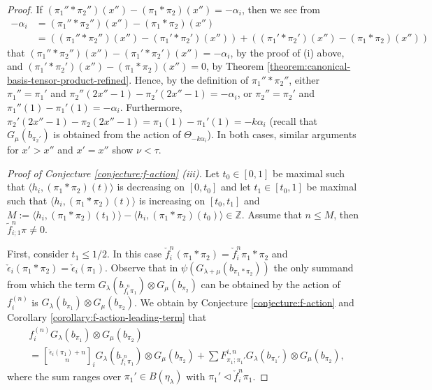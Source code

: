 \documentclass[final]{amsart}
\theoremstyle{plain}
\theoremstyle{definition}
\newcommand{\qbinom}{\genfrac{[}{]}{0pt}{}}
\newcommand{\bbZ}{\mathbb Z}
\newcommand{\tf}{\tilde f}
\newcommand{\cf}{\check{f}}
\newcommand{\cepsilon}{\check{\epsilon}}
\begin{document}
\begin{proof}
    If $(\pi_1''*\pi_2'')(x'') - (\pi_1*\pi_2)(x'') = -\alpha_i$, then we see from
    \begin{align*}
        -\alpha_i
        &= (\pi_1''*\pi_2'')(x'') - (\pi_1*\pi_2)(x'') \\
        &= ((\pi_1''*\pi_2'')(x'') - (\pi_1'*\pi_2')(x'')) + ((\pi_1'*\pi_2')(x'') - (\pi_1*\pi_2)(x''))
    \end{align*}
    that $(\pi_1''*\pi_2'')(x'') - (\pi_1'*\pi_2')(x'') = -\alpha_i$, by the proof of (i) above, and $(\pi_1'*\pi_2')(x'') - (\pi_1*\pi_2)(x'') = 0$, by Theorem \ref{theorem:canonical-basis-tensor-product-refined}.
    Hence, by the definition of $\pi_1''*\pi_2''$, either $\pi_1'' = \pi_1'$ and $\pi_2''(2x''-1) - \pi_2'(2x''-1) = -\alpha_i$, or $\pi_2'' = \pi_2'$ and $\pi_1''(1) - \pi_1'(1) = -\alpha_i$.
    Furthermore, $\pi_2'(2x''-1)- \pi_2(2x''-1) = \pi_1(1) - \pi_1'(1) = -k\alpha_i$ (recall that $G_\mu(b_{\pi_2'})$ is obtained from the action of $\Theta_{-k\alpha_i}$).
    In both cases, similar arguments for $x' > x''$ and $x' = x''$ show $\nu < \tau$.

    \emph{Proof of Conjecture \ref{conjecture:f-action} (iii).}
    Let $t_0 \in [0, 1]$ be maximal such that $\langle h_i, (\pi_1*\pi_2)(t)\rangle$ is decreasing on $[0, t_0]$ and let $t_1 \in [t_0, 1]$ be maximal such that $\langle h_i, (\pi_1*\pi_2)(t)\rangle$ is increasing on $[t_0, t_1]$ and $M := \langle h_i, (\pi_1*\pi_2)(t_1)\rangle - \langle h_i, (\pi_1*\pi_2)(t_0)\rangle \in \bbZ$.
    Assume that $n \le M$, then $\tf_{i;1}^n\pi \neq 0$.

    First, consider $t_1 \le 1/2$.
    In this case $\cf_i^n(\pi_1*\pi_2) = \cf_i^n\pi_1 * \pi_2$ and $\cepsilon_i(\pi_1*\pi_2) = \cepsilon_i(\pi_1)$.
    Observe that in $\psi(G_{\lambda+\mu}(b_{\pi_1*\pi_2}))$ the only summand from which the term $G_\lambda(b_{\cf_i^n\pi_1}) \otimes G_\mu(b_{\pi_2})$ can be obtained by the action of $f_i^{(n)}$ is $G_\lambda(b_{\pi_1}) \otimes G_\mu(b_{\pi_2})$.
    We obtain by Conjecture \ref{conjecture:f-action} and Corollary \ref{corollary:f-action-leading-term} that
    \begin{align*}
        & f_i^{(n)} G_\lambda(b_{\pi_1}) \otimes G_\mu(b_{\pi_2}) \\
        &= \qbinom{\cepsilon_i(\pi_1)+n}{n}_i G_\lambda(b_{\cf_i^n\pi_1}) \otimes G_\mu(b_{\pi_2}) + \sum F_{\pi_1;\pi_1'}^{i,n} G_\lambda(b_{\pi_1'}) \otimes G_\mu(b_{\pi_2}),
    \end{align*}
    where the sum ranges over $\pi_1' \in B(\eta_\lambda)$ with $\pi_1' \triangleleft \cf_i^n\pi_1$.


\end{proof}
\end{document}
